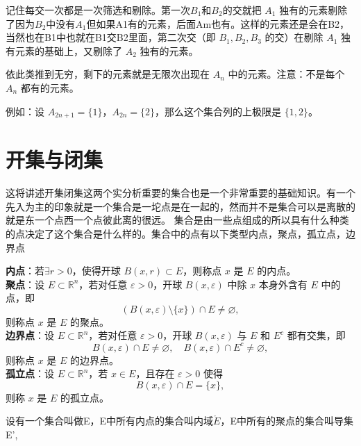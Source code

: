 \documentclass[lang=cn,10pt]{elegantbook}
\begin{document}
\par

记住每交一次都是一次筛选和剔除。第一次$B_1和B_2$的交就把 $A_1$ 独有的元素剔除了因为$B_2$中没有$A_1$但如果A1有的元素，后面Am也有。这样的元素还是会在B2，当然也在B1中也就在B1交B2里面，第二次交（即 $B_1, B_2, B_3$ 的交）在剔除 $A_1$ 独有元素的基础上，又剔除了 $A_2$ 独有的元素。

\par

依此类推到无穷，剩下的元素就是无限次出现在 $A_n$ 中的元素。注意：不是每个 $A_n$ 都有的元素。

例如：设 $A_{2n+1} = \{1\}$，$A_{2n} = \{2\}$，那么这个集合列的上极限是 $\{1, 2\}$。
\section{开集与闭集}
这将讲述开集闭集这两个实分析重要的集合也是一个非常重要的基础知识。有一个先入为主的印象就是一个集合是一坨点是在一起的，然而并不是集合可以是离散的就是东一个点西一个点彼此离的很远。
集合是由一些点组成的所以具有什么种类的点决定了这个集合是什么样的。集合中的点有以下类型内点，聚点，孤立点，边界点
\begin{definition}
    \textbf{内点}：若$\exists r>0$，使得开球 $B(x, r) \subset E$，则称点 $x$ 是 $E$ 的内点。\\
    \textbf{聚点}：设 $E \subset \mathbb{R}^n$，若对任意 $\varepsilon > 0$，开球 $B(x, \varepsilon)$ 中除 $x$ 本身外含有 $E$ 中的点，即
\[
(B(x, \varepsilon) \setminus \{x\}) \cap E \neq \varnothing,
\]
则称点 $x$ 是 $E$ 的聚点。\\
\textbf{边界点}：设 $E \subset \mathbb{R}^n$，若对任意 $\varepsilon > 0$，开球 $B(x, \varepsilon)$ 与 $E$ 和 $E^c$ 都有交集，即
\[
B(x, \varepsilon) \cap E \neq \varnothing,\quad B(x, \varepsilon) \cap E^c \neq \varnothing,
\]
则称点 $x$ 是 $E$ 的边界点。\\
\textbf{孤立点}：设 $E \subset \mathbb{R}^n$，若 $x \in E$，且存在 $\varepsilon > 0$ 使得
\[
B(x, \varepsilon) \cap E = \{x\},
\]
则称 $x$ 是 $E$ 的孤立点。
\end{definition}
设有一个集合叫做E，E中所有内点的集合叫内域$\mathring{E}$，E中所有的聚点的集合叫导集E',
\end{document}
